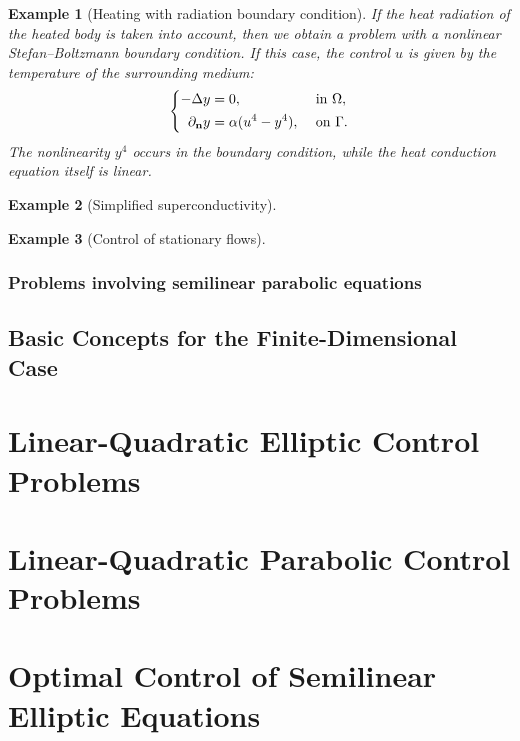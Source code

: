 \documentclass[oneside]{book}
\numberwithin{equation}{section}
\newtheorem{example}{Example}[chapter]
\begin{document}
\begin{example}[Heating with radiation boundary condition]
	If the heat radiation of the heated body is taken into account, then we obtain a problem with a nonlinear Stefan--Boltzmann boundary condition. If this case, the control $u$ is given by the temperature of the surrounding medium:
	\begin{equation*}
		\left\{\begin{split}
			-\Delta y &= 0,&&\mbox{ in }\Omega,\\
			\partial_{\bf n}y &= \alpha(u^4 - y^4),&&\mbox{ on }\Gamma.
		\end{split}\right.
	\end{equation*}
	The nonlinearity $y^4$ occurs in the boundary condition, while the heat conduction equation itself is linear.
\end{example}

\begin{example}[Simplified superconductivity]
	
\end{example}

\begin{example}[Control of stationary flows]
	
\end{example}

\subsubsection{Problems involving semilinear parabolic equations}

\subsection{Basic Concepts for the Finite-Dimensional Case}

\section{Linear-Quadratic Elliptic Control Problems}

\section{Linear-Quadratic Parabolic Control Problems}

\section{Optimal Control of Semilinear Elliptic Equations}
\end{document}
